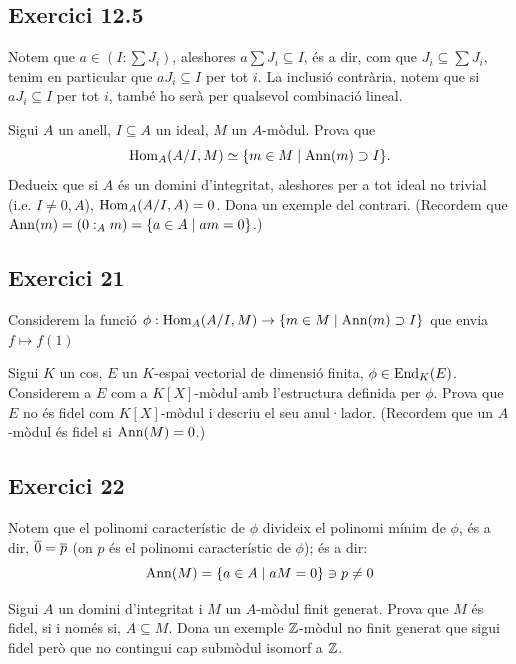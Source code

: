 \documentclass[11pt, a4paper]{article}
\begin{document}
\subsection{Exercici 12.5}
Notem que $a\in (I:\sum J_i)$, aleshores $a\sum J_i\subseteq I$, és a dir, com que $J_i\subseteq \sum J_i$, tenim en particular que $aJ_i\subseteq I$ per tot $i$. La inclusió contrària, notem que si $aJ_i\subseteq I$ per tot $i$, també ho serà per qualsevol combinació lineal.
\newpage
\begin{tcolorbox}[title=\section{Exercici 21}]
    Sigui $A$ un anell, $I\subseteq A$ un ideal, $M$ un $A$-mòdul. Prova que 
    \[\mathrm{Hom}_A(A/I,M)\simeq \{m\in M\mid \mathrm{Ann}(m)\supset I\}.\]
    Dedueix que si $A$ és un domini d'integritat, aleshores per a tot ideal no trivial (i.e. $I\neq 0,A$), $\mathrm{Hom}_A(A/I,A)=0$. Dona un exemple del contrari. (Recordem que $\mathrm{Ann}(m)=(0:_A m)=\{a\in A\mid am=0\}$.)
\end{tcolorbox}
\subsection{Exercici 21}
Considerem la funció $\phi: \mathrm{Hom}_A(A/I,M)\to \{m\in M\mid \mathrm{Ann}(m)\supset I\}$ que envia $f\mapsto f(1)$
\newpage
\begin{tcolorbox}[title=\section{Exercici 22}]
    Sigui $K$ un cos, $E$ un $K$-espai vectorial de dimensió finita, $\phi \in \mathrm{End}_K (E)$. Considerem a $E$ com a $K[X]$-mòdul amb l'estructura definida per $\phi$. Prova que $E$ no és fidel com $K[X]$-mòdul i descriu el seu anul·lador. (Recordem que un $A$-mòdul és fidel si $\mathrm{Ann}(M) = 0$.)
\end{tcolorbox}
\subsection{Exercici 22}
Notem que el polinomi característic de $\phi$ divideix el polinomi mínim de $\phi$, és a dir, $\overline 0=\overline{p}$ (on $p$ és el polinomi característic de $\phi$); és a dir:
\[
    \mathrm{Ann}(M)=\{a\in A\mid aM=0\}\ni p\neq0
\]
\newpage
\begin{tcolorbox}[title=\section{Exercici 23}]
    Sigui $A$ un domini d'integritat i $M$ un $A$-mòdul finit generat. Prova que $M$ és fidel, si i només si, $A\subseteq M$. Dona un exemple $\mathbb Z$-mòdul no finit generat que sigui fidel però que no contingui cap submòdul isomorf a $\mathbb Z$.
\end{tcolorbox}
\end{document}
